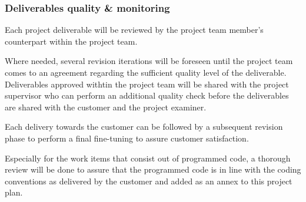 \subsubsection{Deliverables quality \& monitoring}
Each project deliverable will be reviewed by the project team member’s counterpart within the project team.

Where needed, several revision iterations will be foreseen until the project team comes to an agreement regarding the sufficient quality level of the deliverable.
Deliverables approved withtin the project team will be shared with the project supervisor who can perform an additional quality check before the deliverables are shared with the customer and the project examiner.

Each delivery towards the customer can be followed by a subsequent revision phase to perform a final fine-tuning to assure customer satisfaction.

Especially for the work items that consist out of programmed code, a thorough review will be done to assure that the programmed code is in line with the coding conventions as delivered by the customer and added as an annex to this project plan.




